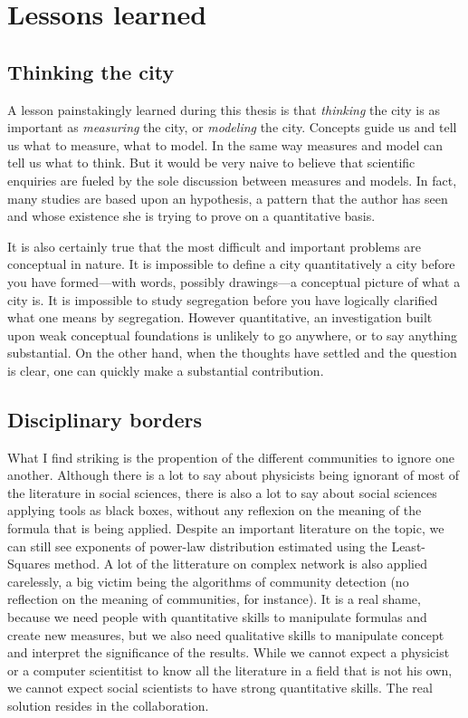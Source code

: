 \section{Lessons learned}
\label{sec:what_the_past_3_years_have_brought}

\subsection{Thinking the city}
\label{sub:thinking_the_city}

A lesson painstakingly learned during this thesis is that \emph{thinking} the
city is as important as \emph{measuring} the city, or \emph{modeling} the city.
Concepts guide us and tell us what to measure, what to model. In the same way
measures and model can tell us what to think. But it would be very naive to
believe that scientific enquiries are fueled by the sole discussion between
measures and models. In fact, many studies are based upon an hypothesis, a
pattern that the author has seen and whose existence she is trying to prove on a
quantitative basis. 

It is also certainly true that the most difficult and important problems are
conceptual in nature.  It is impossible to define a city quantitatively a city
before you have formed---with words, possibly drawings---a conceptual picture of
what a city is.  It is impossible to study segregation before you have logically
clarified what one means by segregation. However quantitative, an investigation
built upon weak conceptual foundations is unlikely to go anywhere, or to say
anything substantial. On the other hand, when the thoughts have settled and the
question is clear, one can quickly make a substantial contribution.\\


\subsection{Disciplinary borders}
\label{sub:disciplinary_borders}

What I find striking is the propention of the different communities to ignore
one another. Although there is a lot to say about physicists being ignorant of
most of the literature in social sciences, there is also a lot to say about
social sciences applying tools as black boxes, without any reflexion on the
meaning of the formula that is being applied. Despite an important literature on
the topic, we can still see exponents of power-law distribution estimated using
the Least-Squares method. A lot of the litterature on complex network is also
applied carelessly, a big victim being the algorithms of community detection (no
reflection on the meaning of communities, for instance). It is a real shame,
because we need people with quantitative skills to manipulate formulas and
create new measures, but we also need qualitative skills to manipulate concept
and interpret the significance of the results. While we cannot expect a
physicist or a computer scientitist to know all the literature in a field that
is not his own, we cannot expect social scientists to have strong quantitative
skills. The real solution resides in the collaboration.\\

